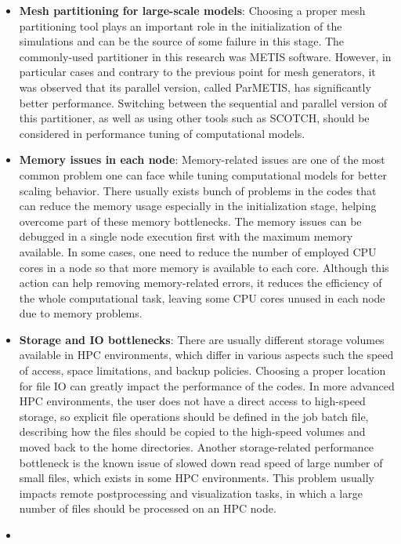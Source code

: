 \begin{itemize}
\item
\textbf{Mesh partitioning for large-scale models}: Choosing a proper mesh partitioning tool plays an important role in the initialization of the simulations and can be the source of some failure in this stage. The commonly-used partitioner in this research was METIS software. However, in particular cases and contrary to the previous point for mesh generators, it was observed that its parallel version, called ParMETIS, has significantly better performance. Switching between the sequential and parallel version of this partitioner, as well as using other tools such as SCOTCH, should be considered in performance tuning of computational models.
\item
\textbf{Memory issues in each node}: Memory-related issues are one of the most common problem one can face while tuning computational models for better scaling behavior. There usually exists bunch of problems in the codes that can reduce the memory usage especially in the initialization stage, helping overcome part of these memory bottlenecks. The memory issues can be debugged in a single node execution first with the maximum memory available. In some cases, one need to reduce the number of employed CPU cores in a node so that more memory is available to each core. Although this action can help removing memory-related errors, it reduces the efficiency of the whole computational task, leaving some CPU cores unused in each node due to memory problems.
\item
\textbf{Storage and IO bottlenecks}: There are usually different storage volumes available in HPC environments, which differ in various aspects such the speed of access, space limitations, and backup policies. Choosing a proper location for file IO can greatly impact the performance of the codes. In more advanced HPC environments, the user does not have a direct access to high-speed storage, so explicit file operations should be defined in the job batch file, describing how the files should be copied to the high-speed volumes and moved back to the home directories. Another storage-related performance bottleneck is the known issue of slowed down read speed of large number of small files, which exists in some HPC environments. This problem usually impacts remote postprocessing and visualization tasks, in which a large number of files should be processed on an HPC node.
\item

\end{itemize}
